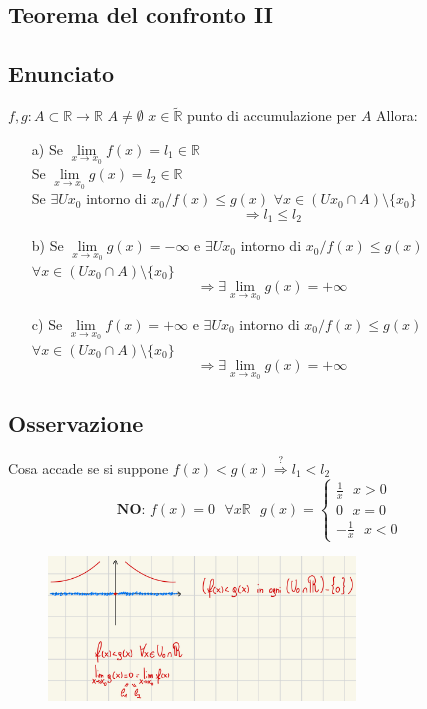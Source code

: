 \documentclass{article}
\newcommand{\R}{\mathbb{R}}
\newcommand{\Rext}{\widetilde{\mathbb{R}}}
\begin{document}
\begin{flushleft}
\section{Teorema del confronto II}
\subsection{Enunciato}
$f, g: A \subset \R \rightarrow \R$ $A \neq \emptyset$ $x \in \Rext$ punto di accumulazione per $A$ Allora:
\begin{enumerate}
        \item[a)]
        Se $\lim\limits_{x \to x_0} f(x) = l_1 \in \R$
        \\Se $\lim\limits_{x \to x_0} g(x) = l_2 \in \R$
        \\Se $\exists U x_0$ intorno di $x_0 / f(x) \leq g(x)$ $\forall x \in (U x_0 \cap A)\setminus \{x_0\}$
        \[\Rightarrow l_1 \leq l_2\]

        \item[b)]
        Se $\lim\limits_{x \to x_0} g(x) = - \infty$ e $\exists U x_0$ intorno di $x_0 / f(x) \leq g(x)$ $\forall x \in (U x_0 \cap A) \setminus \{x_0\}$
        \[ \Rightarrow \exists \lim\limits_{x \to x_0} g(x) = + \infty \]

        \item[c)]
        Se $\lim\limits_{x \to x_0} f(x) = + \infty$ e $\exists U x_0$ intorno di $x_0 / f(x) \leq g(x)$ $\forall x \in (U x_0 \cap A) \setminus \{x_0\}$
        \[ \Rightarrow \exists \lim\limits_{x \to x_0} g(x) = + \infty \]
\end{enumerate}
\subsection{Osservazione}
Cosa accade se si suppone $f(x) < g(x) \overset{?}{\Rightarrow} l_1 < l_2$
\[ 
    \textbf{NO: } f(x)=0 \text{ } \forall x \R \text{ } g(x) = 
    \begin{cases}
        \frac{1}{x} \text{ } x > 0\\
        0 \text{ } x = 0\\
        - \frac{1}{x} \text{ } x < 0
    \end{cases}
\]

\begin{figure}[h]
    \centering
    \includegraphics[width=22em]{./images/Teoriaconfronto2.jpeg}
\end{figure}


\end{flushleft}
\end{document}
